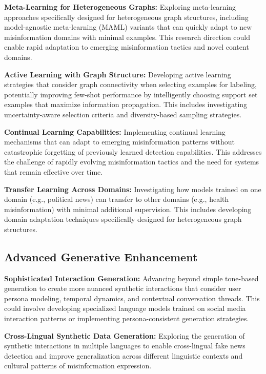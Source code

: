 \textbf{Meta-Learning for Heterogeneous Graphs:} Exploring meta-learning approaches specifically designed for heterogeneous graph structures, including model-agnostic meta-learning (MAML) variants that can quickly adapt to new misinformation domains with minimal examples. This research direction could enable rapid adaptation to emerging misinformation tactics and novel content domains.

\textbf{Active Learning with Graph Structure:} Developing active learning strategies that consider graph connectivity when selecting examples for labeling, potentially improving few-shot performance by intelligently choosing support set examples that maximize information propagation. This includes investigating uncertainty-aware selection criteria and diversity-based sampling strategies.

\textbf{Continual Learning Capabilities:} Implementing continual learning mechanisms that can adapt to emerging misinformation patterns without catastrophic forgetting of previously learned detection capabilities. This addresses the challenge of rapidly evolving misinformation tactics and the need for systems that remain effective over time.

\textbf{Transfer Learning Across Domains:} Investigating how models trained on one domain (e.g., political news) can transfer to other domains (e.g., health misinformation) with minimal additional supervision. This includes developing domain adaptation techniques specifically designed for heterogeneous graph structures.

\subsection{Advanced Generative Enhancement}

\textbf{Sophisticated Interaction Generation:} Advancing beyond simple tone-based generation to create more nuanced synthetic interactions that consider user persona modeling, temporal dynamics, and contextual conversation threads. This could involve developing specialized language models trained on social media interaction patterns or implementing persona-consistent generation strategies.

\textbf{Cross-Lingual Synthetic Data Generation:} Exploring the generation of synthetic interactions in multiple languages to enable cross-lingual fake news detection and improve generalization across different linguistic contexts and cultural patterns of misinformation expression.

